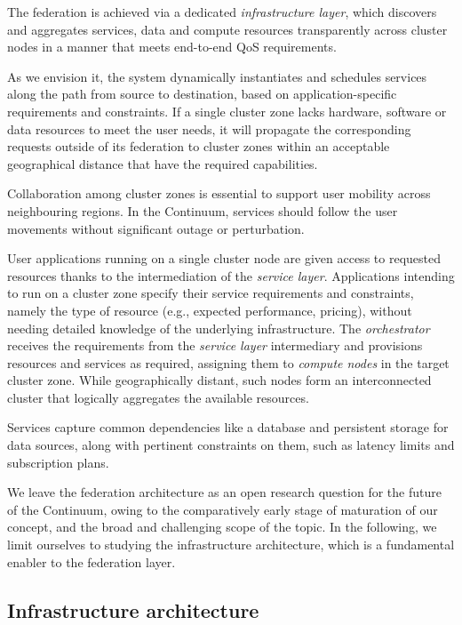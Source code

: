 The federation is achieved via a dedicated \textit{infrastructure layer}, which discovers and aggregates services, data and compute resources transparently across cluster nodes in a manner that meets end-to-end QoS requirements.

As we envision it, the system dynamically instantiates and schedules services along the path from source to destination, based on application-specific requirements and constraints. 
If a single cluster zone lacks hardware, software or data resources to meet the user needs, it will propagate the corresponding requests outside of its federation to cluster zones within an acceptable geographical distance that have the required capabilities.

Collaboration among cluster zones is essential to support user mobility across neighbouring regions. 
In the Continuum, services should follow the user movements without significant outage or perturbation.

User applications running on a single cluster node are given access to requested resources thanks to the intermediation of the \textit{service layer}. Applications intending to run on a cluster zone specify their service requirements and constraints, namely the type of resource (e.g., expected performance, pricing), without needing detailed knowledge of the underlying infrastructure. 
The \textit{orchestrator} receives the requirements from the \textit{service layer} intermediary and provisions resources and services as required, assigning them to \textit{compute nodes} in the target cluster zone.
While geographically distant, such nodes form an interconnected cluster that logically aggregates the available resources.

Services capture common dependencies like a database and persistent storage for data sources, along with pertinent constraints on them, such as latency limits and subscription plans.

We leave the federation architecture as an open research question for the future of the Continuum, owing to the comparatively early stage of maturation of our concept, and the broad and challenging scope of the topic. 
In the following, we limit ourselves to studying the infrastructure architecture, which is a fundamental enabler to the federation layer.

\subsection{Infrastructure architecture}

